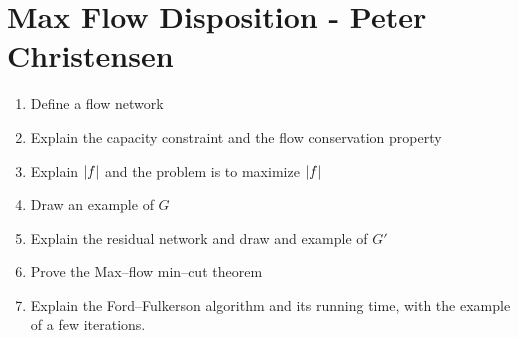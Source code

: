 \section*{Max Flow Disposition - Peter Christensen}
\begin{enumerate}
	\item Define a flow network
	\item Explain the capacity constraint and the flow conservation property
	\item Explain $\lvert f\rvert$ and the problem is to maximize $\lvert f\rvert$
	\item Draw an example of $G$
	\item Explain the residual network and draw and example of $G'$
	\item Prove the Max--flow min--cut theorem
	\item Explain the Ford--Fulkerson algorithm and its running time, with the example of a few iterations.
\end{enumerate}